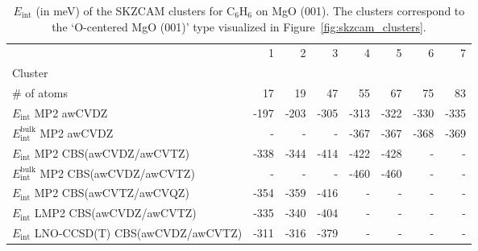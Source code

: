 \begin{table}
\caption{\label{tab:system_eint_mgo_c6h6}$E_\textrm{int}$ (in meV) of the SKZCAM clusters for C$_6$H$_6$ on MgO (001). The clusters correspond to the `O-centered MgO (001)' type visualized in Figure~\ref{fig:skzcam_clusters}.}
\begin{adjustbox}{center,max width=1.4\textwidth}
\begin{tabular}{lrrrrrrr}
\toprule
 & 1 & 2 & 3 & 4 & 5 & 6 & 7 \\ 
Cluster &  &  &  &  &  &  &  \\
\midrule
\# of atoms & 17 & 19 & 47 & 55 & 67 & 75 & 83 \\
$E_\textrm{int}$ MP2 awCVDZ & -197 & -203 & -305 & -313 & -322 & -330 & -335 \\
$E_\textrm{int}^\textrm{bulk}$ MP2 awCVDZ & - & - & - & -367 & -367 & -368 & -369 \\
$E_\textrm{int}$ MP2 CBS(awCVDZ/awCVTZ) & -338 & -344 & -414 & -422 & -428 & - & - \\
$E_\textrm{int}^\textrm{bulk}$ MP2 CBS(awCVDZ/awCVTZ) & - & - & - & -460 & -460 & - & - \\
$E_\textrm{int}$ MP2 CBS(awCVTZ/awCVQZ) & -354 & -359 & -416 & - & - & - & - \\
$E_\textrm{int}$ LMP2 CBS(awCVDZ/awCVTZ) & -335 & -340 & -404 & - & - & - & - \\
$E_\textrm{int}$ LNO-CCSD(T) CBS(awCVDZ/awCVTZ) & -311 & -316 & -379 & - & - & - & - \\
\bottomrule
\end{tabular}
\end{adjustbox}
\end{table}

